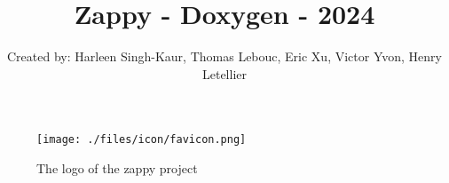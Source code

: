 \documentclass{article}
\title{Zappy - Doxygen - 2024}
\author{Created by: Harleen Singh-Kaur, Thomas Lebouc, Eric Xu, Victor Yvon, Henry Letellier}
\date{} %
\begin{document}
\maketitle

\begin{figure}[h]
    \centering
    \texttt{[image: ./files/icon/favicon.png]}
    \caption*{The logo of the zappy project}
\end{figure}
\end{document}
